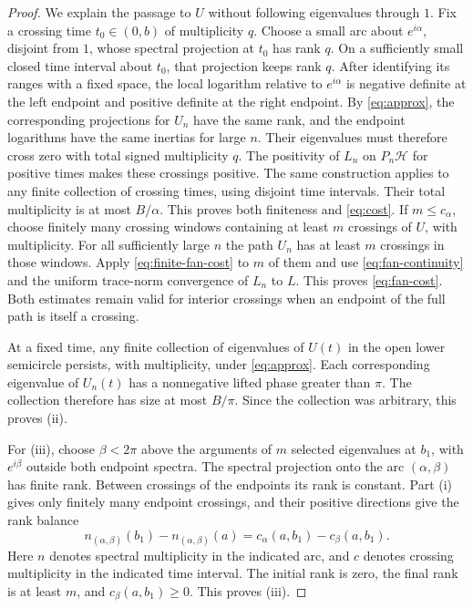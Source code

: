 \documentclass[11pt]{amsart}
\numberwithin{equation}{section}
\newcommand{\Hh}{\mathcal H}
\begin{document}
\begin{proof}
We explain the passage to $U$ without following eigenvalues through
$1$. Fix a crossing time $t_0\in(0,b)$ of multiplicity $q$.
Choose a small arc about $e^{i\alpha}$, disjoint from $1$, whose
spectral projection at $t_0$ has rank $q$. On a sufficiently small
closed time interval about $t_0$, that projection keeps rank $q$.
After identifying its ranges with a fixed space, the local logarithm
relative to $e^{i\alpha}$ is negative definite at the left endpoint
and positive definite at the right endpoint. By \eqref{eq:approx},
the corresponding projections for $U_n$ have the same rank, and
the endpoint logarithms have the same inertias for large $n$.
Their eigenvalues must therefore cross zero with total signed
multiplicity $q$. The positivity of $L_n$ on $P_n\Hh$ for positive
times makes these crossings positive. The same construction applies
to any finite collection of crossing times, using disjoint time
intervals. Their total multiplicity is at most $B/\alpha$.
This proves both finiteness and \eqref{eq:cost}. If $m\le c_\alpha$,
choose finitely many crossing windows containing at least $m$
crossings of $U$, with multiplicity. For all sufficiently large $n$
the path $U_n$ has at least $m$ crossings in those windows.
Apply \eqref{eq:finite-fan-cost} to $m$ of them and use
\eqref{eq:fan-continuity} and the uniform trace-norm convergence
of $L_n$ to $L$. This proves \eqref{eq:fan-cost}. Both estimates
remain valid for interior crossings when an endpoint of the full
path is itself a crossing.

At a fixed time, any finite collection of eigenvalues of $U(t)$
in the open lower semicircle persists, with multiplicity, under
\eqref{eq:approx}. Each corresponding eigenvalue of $U_n(t)$ has
a nonnegative lifted phase greater than $\pi$. The collection
therefore has size at most $B/\pi$. Since the collection was
arbitrary, this proves (ii).

For (iii), choose $\beta<2\pi$ above the arguments of $m$ selected
eigenvalues at $b_1$, with $e^{i\beta}$ outside both endpoint spectra.
The spectral projection onto the arc $(\alpha,\beta)$ has finite
rank. Between crossings of the endpoints its rank is constant.
Part (i) gives only finitely many endpoint crossings, and their
positive directions give the rank balance
\[
 n_{(\alpha,\beta)}(b_1)-n_{(\alpha,\beta)}(a)
 =c_\alpha(a,b_1)-c_\beta(a,b_1).
\]
Here $n$ denotes spectral multiplicity in the indicated arc, and
$c$ denotes crossing multiplicity in the indicated time interval.
The initial rank is zero, the final rank is at least $m$, and
$c_\beta(a,b_1)\ge0$. This proves (iii).
\end{proof}
\end{document}
